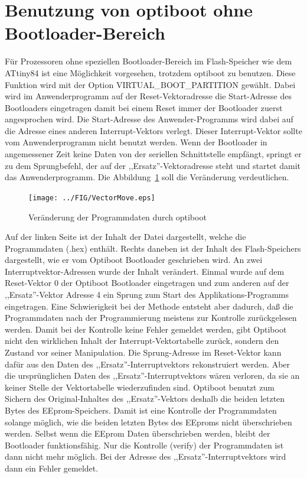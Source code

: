 \section{Benutzung von optiboot ohne Bootloader-Bereich}

Für Prozessoren ohne speziellen Bootloader-Bereich im Flash-Speicher wie dem ATtiny84 ist
eine Möglichkeit vorgesehen, trotzdem optiboot zu benutzen. 
Diese Funktion wird mit der Option VIRTUAL\_BOOT\_PARTITION gewählt.
Dabei wird im Anwenderprogramm auf der Reset-Vektoradresse die Start-Adresse des Bootloaders
eingetragen damit bei einem Reset immer der Bootloader zuerst angesprochen wird.
Die Start-Adresse des Anwender-Programms wird dabei auf die Adresse eines anderen
Interrupt-Vektors verlegt. Dieser Interrupt-Vektor sollte vom Anwenderprogramm nicht benutzt werden.
Wenn der Bootloader in angemessener Zeit keine Daten von der seriellen Schnittstelle
empfängt, springt er zu dem Sprungbefehl, der auf der ,,Ersatz''-Vektoradresse steht und
startet damit das Anwenderprogramm.
Die Abbildung~\ref{fig:VectorMove} soll die Veränderung verdeutlichen.

\begin{figure}[H]
\centering
\texttt{[image: ../FIG/VectorMove.eps]}
\caption{Veränderung der Programmdaten durch optiboot}
\label{fig:VectorMove}
\end{figure}

Auf der linken Seite ist der Inhalt der Datei dargestellt, welche die Programmdaten (.hex) enthält.
Rechts daneben ist der Inhalt des Flash-Speichers dargestellt, wie er vom Optiboot Bootloader
geschrieben wird. An zwei Interruptvektor-Adressen wurde der Inhalt verändert.
Einmal wurde auf dem Reset-Vektor 0 der Optiboot Bootloader eingetragen und zum anderen
auf der ,,Ersatz''-Vektor Adresse 4 ein Sprung zum Start des Applikations-Programms eingetragen. 
Eine Schwierigkeit bei der Methode entsteht aber dadurch, daß die Programmdaten nach
der Programmierung meistens zur Kontrolle zurückgelesen werden.
Damit bei der Kontrolle keine Fehler gemeldet werden, gibt Optiboot nicht den wirklichen Inhalt
der Interrupt-Vektortabelle zurück, sondern den Zustand vor seiner Manipulation.
Die Sprung-Adresse im Reset-Vektor kann dafür aus den Daten des ,,Ersatz''-Interruptvektors rekonstruiert werden.
Aber die ursprünglichen Daten des ,,Ersatz''-Interruptvektors wären verloren, da sie an keiner
Stelle der Vektortabelle wiederzufinden sind.
Optiboot benutzt zum Sichern des Original-Inhaltes des ,,Ersatz''-Vektors deshalb die beiden letzten
Bytes des EEprom-Speichers.
Damit ist eine Kontrolle der Programmdaten solange möglich, wie die beiden letzten Bytes
des EEproms nicht überschrieben werden.
Selbst wenn die EEprom Daten überschrieben werden, bleibt der Bootloader funktionsfähig.
Nur die Kontrolle (verify) der Programmdaten ist dann nicht mehr möglich. Bei der Adresse
des ,,Ersatz''-Interruptvektors wird dann ein Fehler gemeldet.

